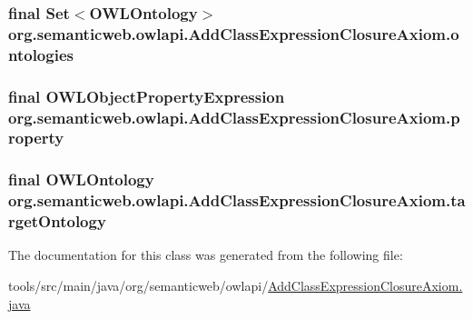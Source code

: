 \hypertarget{classorg_1_1semanticweb_1_1owlapi_1_1_add_class_expression_closure_axiom_ab96f29d5961bedbb82a9255de0c01b5e}{
\subsubsection[{ontologies}]{\setlength{\rightskip}{0pt plus 5cm}final Set$<${\bf O\-W\-L\-Ontology}$>$ org.\-semanticweb.\-owlapi.\-Add\-Class\-Expression\-Closure\-Axiom.\-ontologies\hspace{0.3cm}{\ttfamily [private]}}}\label{classorg_1_1semanticweb_1_1owlapi_1_1_add_class_expression_closure_axiom_ab96f29d5961bedbb82a9255de0c01b5e}
\hypertarget{classorg_1_1semanticweb_1_1owlapi_1_1_add_class_expression_closure_axiom_aef1be2bdc5dd0f1a365ebbe9814745d4}{
\subsubsection[{property}]{\setlength{\rightskip}{0pt plus 5cm}final {\bf O\-W\-L\-Object\-Property\-Expression} org.\-semanticweb.\-owlapi.\-Add\-Class\-Expression\-Closure\-Axiom.\-property\hspace{0.3cm}{\ttfamily [protected]}}}\label{classorg_1_1semanticweb_1_1owlapi_1_1_add_class_expression_closure_axiom_aef1be2bdc5dd0f1a365ebbe9814745d4}
\hypertarget{classorg_1_1semanticweb_1_1owlapi_1_1_add_class_expression_closure_axiom_a1b4cd911a872415e0a76a25714595470}{
\subsubsection[{target\-Ontology}]{\setlength{\rightskip}{0pt plus 5cm}final {\bf O\-W\-L\-Ontology} org.\-semanticweb.\-owlapi.\-Add\-Class\-Expression\-Closure\-Axiom.\-target\-Ontology\hspace{0.3cm}{\ttfamily [private]}}}\label{classorg_1_1semanticweb_1_1owlapi_1_1_add_class_expression_closure_axiom_a1b4cd911a872415e0a76a25714595470}


The documentation for this class was generated from the following file\-:\begin{DoxyCompactItemize}
\item 
tools/src/main/java/org/semanticweb/owlapi/\hyperlink{_add_class_expression_closure_axiom_8java}{Add\-Class\-Expression\-Closure\-Axiom.\-java}\end{DoxyCompactItemize}
